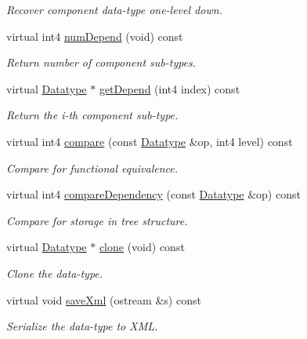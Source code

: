 \begin{DoxyCompactItemize}
\begin{DoxyCompactList}\small\item\em Recover component data-\/type one-\/level down. \end{DoxyCompactList}\item 
virtual int4 \mbox{\hyperlink{class_type_struct_ad4722efdae4b6f71e7c9d2b6624e4c12}{num\+Depend}} (void) const
\begin{DoxyCompactList}\small\item\em Return number of component sub-\/types. \end{DoxyCompactList}\item 
virtual \mbox{\hyperlink{class_datatype}{Datatype}} $\ast$ \mbox{\hyperlink{class_type_struct_ae60274464ed0003c0ee86f8bf3fa28c8}{get\+Depend}} (int4 index) const
\begin{DoxyCompactList}\small\item\em Return the i-\/th component sub-\/type. \end{DoxyCompactList}\item 
virtual int4 \mbox{\hyperlink{class_type_struct_a7f06b400a7d74394512a9f67ec925310}{compare}} (const \mbox{\hyperlink{class_datatype}{Datatype}} \&op, int4 level) const
\begin{DoxyCompactList}\small\item\em Compare for functional equivalence. \end{DoxyCompactList}\item 
virtual int4 \mbox{\hyperlink{class_type_struct_a12078b87b7fbc0f2ed5cb01ee5c61050}{compare\+Dependency}} (const \mbox{\hyperlink{class_datatype}{Datatype}} \&op) const
\begin{DoxyCompactList}\small\item\em Compare for storage in tree structure. \end{DoxyCompactList}\item 
virtual \mbox{\hyperlink{class_datatype}{Datatype}} $\ast$ \mbox{\hyperlink{class_type_struct_a24e7e1af1cc231759cecf8445532f613}{clone}} (void) const
\begin{DoxyCompactList}\small\item\em Clone the data-\/type. \end{DoxyCompactList}\item 
virtual void \mbox{\hyperlink{class_type_struct_a5284d41a9de3664a4e08ed8649164873}{save\+Xml}} (ostream \&s) const
\begin{DoxyCompactList}\small\item\em Serialize the data-\/type to X\+ML. \end{DoxyCompactList}\end{DoxyCompactItemize}
